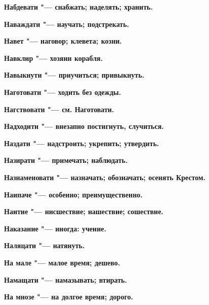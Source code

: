 \begin{mymulticols}{2}
\bfseries Набдевати\normalfont{} "--- снабжать; наделять; хранить. 




\bfseries Наваждати\normalfont{} "--- научать; подстрекать. 




\bfseries Навет\normalfont{} "--- наговор; клевета; козни. 




\bfseries Навклир\normalfont{} "--- хозяин корабля. 




\bfseries Навыкнути\normalfont{} "--- приучиться; привыкнуть. 




\bfseries Наготовати\normalfont{} "--- ходить без одежды. 




\bfseries Нагствовати\normalfont{} "--- см. Наготовати. 




\bfseries Надходити\normalfont{} "--- внезапно постигнуть, случиться. 




\bfseries Наздати\normalfont{} "--- надстроить; укрепить; утвердить. 




\bfseries Назирати\normalfont{} "--- примечать; наблюдать. 




\bfseries Назнаменовати\normalfont{} "--- назначать; обозначать; осенять Крестом. 




\bfseries Наипаче\normalfont{} "--- особенно; преимущественно. 




\bfseries Наитие\normalfont{} "--- нисшествие; нашествие; сошествие. 




\bfseries Наказание\normalfont{} "--- иногда: учение. 




\bfseries Наляцати\normalfont{} "--- натянуть. 




\bfseries На мале\normalfont{} "--- малое время; дешево. 




\bfseries Намащати\normalfont{} "--- намазывать; втирать. 




\bfseries На мнозе\normalfont{} "--- на долгое время; дорого. 





\end{mymulticols}
